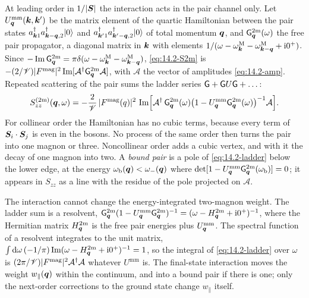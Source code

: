 At leading order in $1/|\bm{S}|$ the interaction acts in the pair channel only. Let $U^{\mathrm{mm}}_{\bm{q}}(\bm{k},\bm{k}')$ be the matrix element of the quartic Hamiltonian between the pair states $a^\dagger_{\bm{k}1}a^\dagger_{\bm{k}-\bm{q},2}|0\rangle$ and $a^\dagger_{\bm{k}'1}a^\dagger_{\bm{k}'-\bm{q},2}|0\rangle$ of total momentum $\bm{q}$, and $\mathsf{G}^{\mathrm{2m}}_{\bm{q}}(\omega)$ the free pair propagator, a diagonal matrix in $\bm{k}$ with elements $1/(\omega - \omega^{\mathrm{M}}_{\bm{k}} - \omega^{\mathrm{M}}_{\bm{k}-\bm{q}} + \mathrm{i}0^+)$. Since $-\operatorname{Im}\mathsf{G}^{\mathrm{2m}}_{\bm{q}} = \pi\delta(\omega - \omega^{\mathrm{M}}_{\bm{k}} - \omega^{\mathrm{M}}_{\bm{k}-\bm{q}})$, \cref{eq:14.2-S2m} is $-(2/\mathscr{V})|F^{\mathrm{mag}}|^2\operatorname{Im}[\mathcal{A}^\dagger\mathsf{G}^{\mathrm{2m}}_{\bm{q}}\mathcal{A}]$, with $\mathcal{A}$ the vector of amplitudes \cref{eq:14.2-amp}. Repeated scattering of the pair sums the ladder series $\mathsf{G} + \mathsf{G} U\mathsf{G} + \dots$:
\begin{equation}
  S^{(2\mathrm{m})}_{zz}(\bm{q},\omega) = -\frac{2}{\mathscr{V}}\,|F^{\mathrm{mag}}(q)|^2\,\operatorname{Im}\Bigl[\mathcal{A}^\dagger\,\mathsf{G}^{\mathrm{2m}}_{\bm{q}}(\omega)\bigl(1 - U^{\mathrm{mm}}_{\bm{q}}\mathsf{G}^{\mathrm{2m}}_{\bm{q}}(\omega)\bigr)^{-1}\mathcal{A}\Bigr] .
  \label{eq:14.2-ladder}
\end{equation}
For collinear order the Hamiltonian has no cubic terms, because every term of $\bm{S}_i\cdot\bm{S}_j$ is even in the bosons. No process of the same order then turns the pair into one magnon or three. Noncollinear order adds a cubic vertex, and with it the decay of one magnon into two. A \emph{bound pair} is a pole of \cref{eq:14.2-ladder} below the lower edge, at the energy $\omega_{\mathrm{b}}(\bm{q}) < \omega_-(\bm{q})$ where $\det[1 - U^{\mathrm{mm}}_{\bm{q}}\mathsf{G}^{\mathrm{2m}}_{\bm{q}}(\omega_{\mathrm{b}})] = 0$; it appears in $S_{zz}$ as a line with the residue of the pole projected on $\mathcal{A}$.

The interaction cannot change the energy-integrated two-magnon weight. The ladder sum is a resolvent, $\mathsf{G}^{\mathrm{2m}}_{\bm{q}}(1 - U^{\mathrm{mm}}_{\bm{q}}\mathsf{G}^{\mathrm{2m}}_{\bm{q}})^{-1} = (\omega - H^{\mathrm{2m}}_{\bm{q}} + \mathrm{i}0^+)^{-1}$, where the Hermitian matrix $H^{\mathrm{2m}}_{\bm{q}}$ is the free pair energies plus $U^{\mathrm{mm}}_{\bm{q}}$. The spectral function of a resolvent integrates to the unit matrix, $\int\mathrm{d}\omega\,(-1/\pi)\operatorname{Im}(\omega - H^{\mathrm{2m}}_{\bm{q}} + \mathrm{i}0^+)^{-1} = 1$, so the integral of \cref{eq:14.2-ladder} over $\omega$ is $(2\pi/\mathscr{V})|F^{\mathrm{mag}}|^2\mathcal{A}^\dagger\mathcal{A}$ whatever $U^{\mathrm{mm}}$ is. The final-state interaction moves the weight $w_\parallel(\bm{q})$ within the continuum, and into a bound pair if there is one; only the next-order corrections to the ground state change $w_\parallel$ itself.

